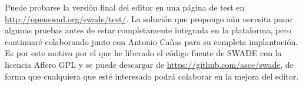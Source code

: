 Puede probarse la versión final del editor en una página de test en \url{http://openswad.org/swade/test/}. La solución que propongo aún necesita pasar algunas pruebas antes de estar completamente integrada en la plataforma, pero continuaré colaborando junto con Antonio Cañas para su completa implantación. Es por este motivo por el que he liberado el código fuente de SWADE con la licencia Affero GPL y se puede descargar de \url{https://github.com/asce/swade}, de forma que cualquiera que esté interesado podrá colaborar en la mejora del editor.

